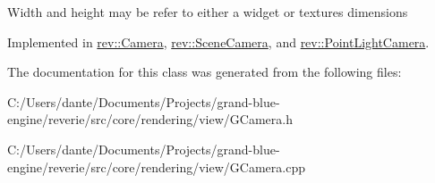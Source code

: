 Width and height may be refer to either a widget or texture\textquotesingle{}s dimensions 

Implemented in \mbox{\hyperlink{classrev_1_1_camera_a38127b7e39468bb9116f3bcc3b3bcb1f}{rev\+::\+Camera}}, \mbox{\hyperlink{classrev_1_1_scene_camera_a2cc00ef51c784af2cdf9fe9308177c1a}{rev\+::\+Scene\+Camera}}, and \mbox{\hyperlink{classrev_1_1_point_light_camera_afff4fe381e8872b5db8cbc7f573e3ca9}{rev\+::\+Point\+Light\+Camera}}.



The documentation for this class was generated from the following files\+:\begin{DoxyCompactItemize}
\item 
C\+:/\+Users/dante/\+Documents/\+Projects/grand-\/blue-\/engine/reverie/src/core/rendering/view/G\+Camera.\+h\item 
C\+:/\+Users/dante/\+Documents/\+Projects/grand-\/blue-\/engine/reverie/src/core/rendering/view/G\+Camera.\+cpp\end{DoxyCompactItemize}
